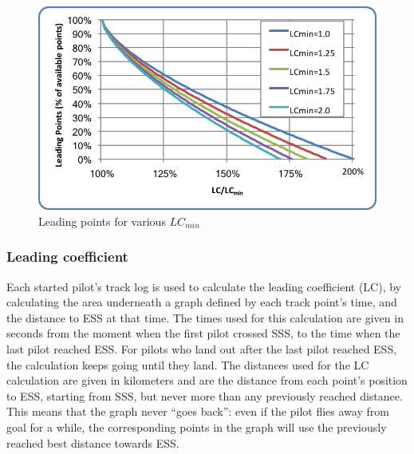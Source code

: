 \documentclass{article}
\begin{document}
\begin{figure}[h]
    \centering
    \includegraphics[scale=0.8]{img/leading-points.png}
    \caption{Leading points for various \(LC_{min}\)}
    \label{fig:leading-points}
\end{figure}

\subsubsection{Leading coefficient}
Each started pilot’s track log is used to calculate the leading coefficient
(LC), by calculating the area underneath a graph defined by each track point’s
time, and the distance to ESS at that time. The times used for this calculation
are given in seconds from the moment when the first pilot crossed SSS, to the
time when the last pilot reached ESS. For pilots who land out after the last
pilot reached ESS, the calculation keeps going until they land. The distances
used for the LC calculation are given in kilometers and are the distance from
each point’s position to ESS, starting from SSS, but never more than any
previously reached distance. This means that the graph never “goes back”: even
if the pilot flies away from goal for a while, the corresponding points in the
graph will use the previously reached best distance towards ESS.
\end{document}
